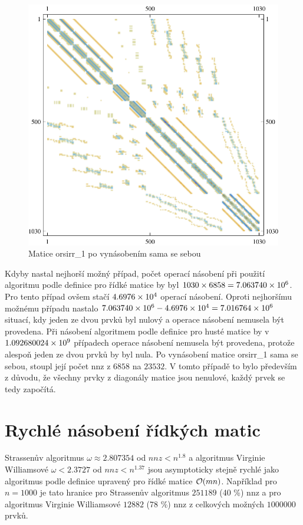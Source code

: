 \begin{figure}[htb]
	\includegraphics[width=1.0\textwidth]{./images/orsirr_1_mul}
	\caption{Matice orsirr\_1 po vynásobením sama se sebou}
	\label{fig:aftOrsirr1}
\end{figure}

Kdyby nastal nejhorší možný případ, počet operací násobení při použití algoritmu podle definice pro řídké matice by byl $1030 \times 6858 = 7.063740\times 10^{6}$. Pro tento případ ovšem stačí $4.6976\times 10^{4}$ operací násobení. Oproti nejhoršímu možnému případu nastalo $7.063740\times 10^{6} - 4.6976\times 10^{4} = 7.016764\times 10^{6}$ situací, kdy jeden ze dvou prvků byl nulový a operace násobení nemusela být provedena. Při násobení algoritmem podle definice pro husté matice by v $1.092680024\times 10^{9}$ případech operace násobení nemusela být provedena, protože alespoň jeden ze dvou prvků by byl nula. Po vynásobení matice orsirr\_1 sama se sebou, stoupl její počet nnz z $6858$ na $23532$. V tomto případě to bylo především z důvodu, že všechny prvky z diagonály matice jsou nenulové, každý prvek se tedy započítá.

\label{fast-sparse}
\section{Rychlé násobení řídkých matic}

Strassenův algoritmus $\omega\approx2.807354$ od $nnz<n^{1.8}$ a algoritmus Virginie Williamsové $\omega<2.3727$ od $nnz<n^{1.37}$ jsou asymptoticky stejně rychlé jako algoritmus podle definice upravený pro řídké matice $\mathcal{O}(mn)$. Například pro $n=1000$ je tato hranice pro Strassenův algoritmus $251189$ (40 \%) nnz a pro algoritmus Virginie Williamsové $12882$ (78 \%) nnz z celkových možných $1000000$ prvků.

